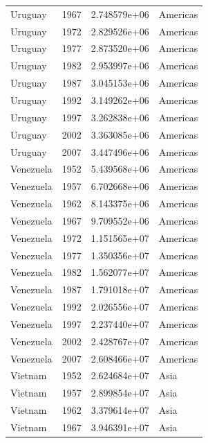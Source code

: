 \documentclass[
  letterpaper,
  DIV=11,
  numbers=noendperiod]{scrreprt}
\begin{document}
\begin{tcolorbox}
\begin{tabular}{lrrl}
Uruguay                  &  1967 &  2.748579e+06 &  Americas \\
Uruguay                  &  1972 &  2.829526e+06 &  Americas \\
Uruguay                  &  1977 &  2.873520e+06 &  Americas \\
Uruguay                  &  1982 &  2.953997e+06 &  Americas \\
Uruguay                  &  1987 &  3.045153e+06 &  Americas \\
Uruguay                  &  1992 &  3.149262e+06 &  Americas \\
Uruguay                  &  1997 &  3.262838e+06 &  Americas \\
Uruguay                  &  2002 &  3.363085e+06 &  Americas \\
Uruguay                  &  2007 &  3.447496e+06 &  Americas \\
Venezuela                &  1952 &  5.439568e+06 &  Americas \\
Venezuela                &  1957 &  6.702668e+06 &  Americas \\
Venezuela                &  1962 &  8.143375e+06 &  Americas \\
Venezuela                &  1967 &  9.709552e+06 &  Americas \\
Venezuela                &  1972 &  1.151565e+07 &  Americas \\
Venezuela                &  1977 &  1.350356e+07 &  Americas \\
Venezuela                &  1982 &  1.562077e+07 &  Americas \\
Venezuela                &  1987 &  1.791018e+07 &  Americas \\
Venezuela                &  1992 &  2.026556e+07 &  Americas \\
Venezuela                &  1997 &  2.237440e+07 &  Americas \\
Venezuela                &  2002 &  2.428767e+07 &  Americas \\
Venezuela                &  2007 &  2.608466e+07 &  Americas \\
Vietnam                  &  1952 &  2.624684e+07 &      Asia \\
Vietnam                  &  1957 &  2.899854e+07 &      Asia \\
Vietnam                  &  1962 &  3.379614e+07 &      Asia \\
Vietnam                  &  1967 &  3.946391e+07 &      Asia \\

\end{tabular}
\end{tcolorbox}
\end{document}
